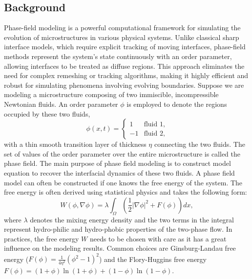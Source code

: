 \subsection{Background}
Phase-field modeling is a powerful computational framework for simulating the evolution of microstructures in various physical systems. Unlike classical sharp interface models, which require explicit tracking of moving interfaces, phase-field methods represent the system's state continuously with an order parameter, allowing interfaces to be treated as diffuse regions. This approach eliminates the need for complex remeshing or tracking algorithms, making it highly efficient and robust for simulating phenomena involving evolving boundaries. Suppose we are modeling a microstructure composing of two immiscible, incompressible Newtonian fluids. An order parameter $\phi$ is employed to denote the regions occupied by these two fluids,
\[
\phi(x, t) =
\begin{cases} 
1 & \text{fluid 1}, \\
-1 & \text{fluid 2},
\end{cases}
\]
with a thin smooth transition layer of thickness $\eta$ connecting the two fluids. The set of values of the order parameter over the entire microstructure is called the phase field. The main purpose of phase field modeling is to construct model equation to recover the interfacial dynamics of these two fluids. A phase field model can often be constructed if one knows the free energy of the system. The free energy is often derived using statistical physics and takes the following form:
\begin{equation}
    W( \phi, \nabla \phi ) = \lambda \int_{\Omega} ( \frac{1}{2}  |\nabla \phi|^2 + F( \phi ) ) dx,
\end{equation}
where $\lambda$ denotes the mixing energy density and the two terms in the integral represent hydro-philic and hydro-phobic properties of the two-phase flow. In practices, the free energy $W$ needs to be chosen with care as it has a great influence on the modeling results. Common choices are Ginsburg-Landau free energy ($F( \phi ) = \frac{1}{4 \eta^2} ( \phi^2 - 1 )^2$) and the Flory-Huggins free energy $F( \phi ) = (1 + \phi) \ln{(1 + \phi)} + (1 - \phi) \ln{(1 - \phi)}$.

